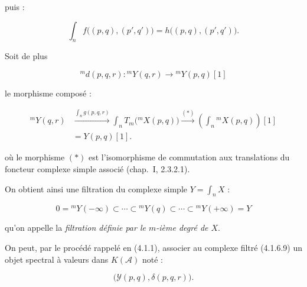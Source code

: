 \clearpage
{}%
\begingroup\small\setlength{\parskip}{0pt}\setlength{\emergencystretch}{1.5em}
\setlength{\abovedisplayskip}{4pt plus 2pt minus 2pt}%
\setlength{\belowdisplayskip}{4pt plus 2pt minus 2pt}%

\noindent puis :

\begin{equation}
\int_n f\bigl((p,q),(p',q')\bigr)
=h\bigl((p,q),(p',q')\bigr).
\tag{4.1.6.6}
\end{equation}

Soit de plus

\begin{equation}
{}^{m}\!d(p,q,r)\colon{}^{m}\!Y(q,r)
\longrightarrow{}^{m}\!Y(p,q)[1]
\tag{4.1.6.7}
\end{equation}

le morphisme composé :

\begin{equation}
\begin{aligned}
{}^{m}\!Y(q,r)
&\xrightarrow{\int_n g(p,q,r)}
\int_n T_m\bigl({}^{m}\!X(p,q)\bigr)
\xrightarrow{(*)}
\left(\int_n{}^{m}\!X(p,q)\right)[1]\\
&=Y(p,q)[1].
\end{aligned}
\tag{4.1.6.8}
\end{equation}

où le morphisme $(*)$ est l'isomorphisme de commutation aux translations du
foncteur complexe simple associé (chap.~I, 2.3.2.1).

On obtient ainsi une filtration du complexe simple $Y=\int_n X$ :

\begin{equation}
0={}^{m}\!Y(-\infty)\subset\cdots\subset{}^{m}\!Y(q)
\subset\cdots\subset{}^{m}\!Y(+\infty)=Y
\tag{4.1.6.9}
\end{equation}

qu'on appelle la \emph{filtration définie par le $m$-ième degré de $X$}.

On peut, par le procédé rappelé en (4.1.1), associer au complexe filtré
(4.1.6.9) un objet spectral à valeurs dans $K(\mathcal A)$ noté :

\begin{equation}
\bigl(\mathcal Y(p,q),\delta(p,q,r)\bigr).
\tag{4.1.6.10}
\end{equation}

